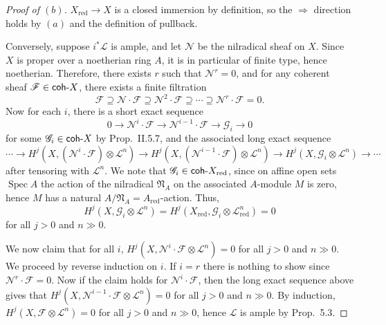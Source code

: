 \documentclass[10pt]{article}
\theoremstyle{definition}
\theoremstyle{remark}
\numberwithin{equation}{section}
\numberwithin{figure}{subsubsection}
\DeclareMathOperator{\Spec}{Spec}
\newcommand{\FF}{\mathscr{F}}
\newcommand{\LL}{\mathscr{L}}
\newcommand{\red}{\mathrm{red}}
\newcommand{\coh}{\mathsf{coh}\mathchar`-}
\begin{document}
\begin{proof}[Proof of $(b)$]
  $X_\red \to X$ is a closed immersion by definition, so the $\Rightarrow$
  direction holds by $(a)$ and the definition of pullback.
  \par Conversely, suppose $i^*\LL$ is ample, and let $\mathscr{N}$ be the
  nilradical sheaf on $X$. Since $X$ is proper over a noetherian ring $A$, it is
  in particular of finite type, hence noetherian. Therefore, there exists $r$
  such that $\mathscr{N}^r = 0$, and for any coherent sheaf $\FF \in \coh X$,
  there exists a finite filtration
  \begin{equation*}
    \FF \supseteq \mathscr{N} \cdot \FF \supseteq \mathscr{N}^2
    \cdot \FF \supseteq \cdots \supseteq \mathscr{N}^{r}\cdot\FF = 0.
  \end{equation*}
  Now for each $i$, there is a short exact sequence
  \begin{equation*}
    0 \longrightarrow \mathscr{N}^{i} \cdot \FF \longrightarrow
    \mathscr{N}^{i-1} \cdot \FF \longrightarrow \mathscr{G}_i \longrightarrow 0
  \end{equation*}
  for some $\mathscr{G}_i \in \coh X$ by Prop.\ II.5.7, and the associated long
  exact sequence
  \begin{equation*}
    \cdots \longrightarrow H^j(X,(\mathscr{N}^{i} \cdot \FF) \otimes \LL^n)
    \longrightarrow
    H^j(X,(\mathscr{N}^{i-1} \cdot \FF) \otimes \LL^n)
    \longrightarrow H^j(X,\mathscr{G}_i \otimes \LL^n)
    \longrightarrow \cdots
  \end{equation*}
  after tensoring with $\LL^n$. We note that $\mathscr{G}_i \in \coh X_\red$,
  since on affine open sets $\Spec A$ the action of the nilradical
  $\mathfrak{N}_A$ on the associated $A$-module $M$ is zero, hence $M$ has a
  natural $A/\mathfrak{N}_A = A_\red$-action. Thus,
  \begin{equation*}
    H^j(X,\mathscr{G}_i \otimes \LL^n) = H^j(X_\red,\mathscr{G}_i \otimes
    \LL^n_\red) = 0
  \end{equation*}
  for all $j > 0$ and $n \gg 0$.
  \par We now claim that for all $i$, $H^j(X,\mathscr{N}^i\cdot\FF\otimes\LL^n) = 0$
  for all $j > 0$ and $n \gg 0$. We proceed by reverse induction on $i$. If $i =
  r$ there is nothing to show since $\mathscr{N}^r\cdot\FF = 0$. Now if the
  claim holds for $\mathscr{N}^{i}\cdot\FF$, then the long exact sequence above
  gives that $H^j(X,\mathscr{N}^{i-1}\cdot\FF\otimes\LL^n) = 0$ for all $j > 0$
  and $n \gg 0$. By induction, $H^j(X,\FF\otimes\LL^n) = 0$ for all $j > 0$ and
  $n \gg 0$, hence $\LL$ is ample by Prop.\ 5.3.
\end{proof}
\end{document}

